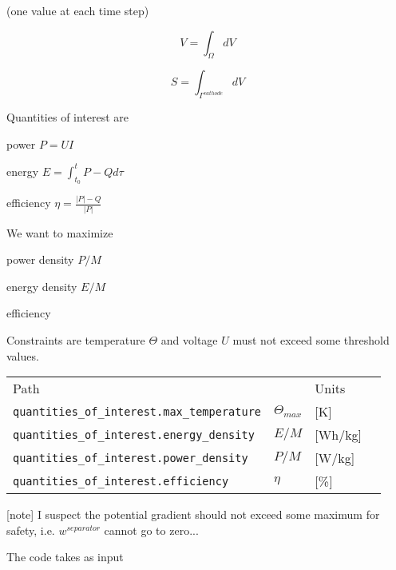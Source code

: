\documentclass[10pt, oneside]{article}   	%
\begin{document}
(one value at each time step)

\begin{equation}
V = \int_\Omega dV
\end{equation}

\begin{equation}
S = \int_{\Gamma^{cathode}} dV
\end{equation}

Quantities of interest are 

power $P=UI$

energy $E=\int_{t_0}^t P - Q d\tau$

efficiency $\eta=\frac{|P|-Q}{|P|}$

We want to maximize 

power density $P/M$

energy density $E/M$

efficiency

Constraints are 
temperature $\Theta$ and voltage $U$ must not exceed some threshold values.

{\footnotesize
\begin{tabular}{llll}
Path                      &     & Units \\
\texttt{quantities\_of\_interest.max\_temperature} & $\Theta_{max}$ & [K] \\
\texttt{quantities\_of\_interest.energy\_density}  & $E/M$          & [Wh/kg] \\
\texttt{quantities\_of\_interest.power\_density}   & $P/M$          & [W/kg] \\
\texttt{quantities\_of\_interest.efficiency}       & $\eta$         & [\%] \\
\end{tabular}
}


[note] 
I suspect the potential gradient should not exceed some maximum for safety,
i.e. $w^{separator}$ cannot go to zero...

The code takes as input
\end{document}
